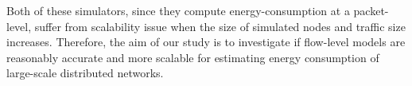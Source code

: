 Both of these simulators, since they compute energy-consumption at a packet-level, suffer from scalability issue when the size of simulated nodes and traffic size increases. Therefore, the aim of our study is to investigate if flow-level models are reasonably accurate and more scalable for estimating energy consumption of large-scale distributed networks.


